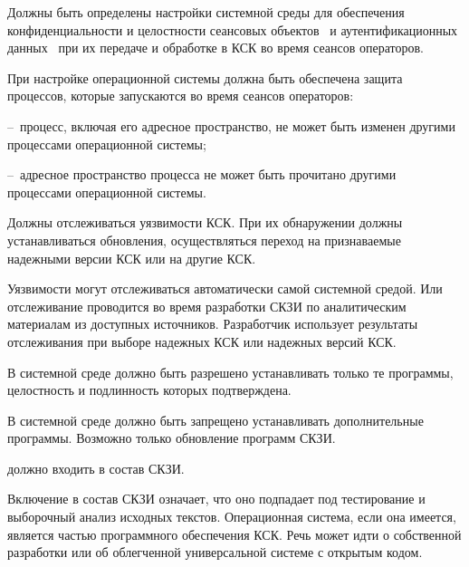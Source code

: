 \label{R.ES.Session}
Должны быть определены настройки системной среды
для обеспечения конфиденциальности и целостности сеансовых 
объектов~ и аутентификационных 
данных~ при их передаче и  
обработке в КСК во время сеансов операторов.

\begin{note}
При настройке операционной системы должна быть обеспечена защита 
процессов, которые запускаются во время сеансов операторов:

--~процесс, включая его адресное пространство, не может быть 
изменен другими процессами операционной системы;

--~адресное пространство процесса не может быть прочитано другими процессами 
операционной системы.
\end{note}

\label{R.ES.CVE}
Должны отслеживаться уязвимости КСК. При их обнаружении должны 
устанавливаться обновления, осуществляться переход на признаваемые надежными
версии КСК или на другие КСК.

\begin{note}
Уязвимости могут отслеживаться автоматически самой системной средой.
Или отслеживание проводится во время разработки СКЗИ по аналитическим
материалам из доступных источников. Разработчик использует результаты
отслеживания при выборе надежных КСК или надежных версий КСК.
\end{note}

\label{R.ES.AuthCode}
В системной среде должно быть разрешено устанавливать только те программы,
целостность и подлинность которых подтверждена.


\label{R.ES.NoCode}
В системной среде должно быть запрещено устанавливать дополнительные программы.
Возможно только обновление программ СКЗИ.

\label{R.ES.OS}
 должно входить в состав СКЗИ.


\begin{note}
Включение  в состав СКЗИ означает, что оно 
подпадает под тестирование и выборочный анализ исходных текстов. 
%
Операционная система, если она имеется, является частью программного 
обеспечения КСК. 
%
Речь может идти 
о  
собственной разработки или 
об облегченной универсальной  системе с 
открытым кодом.
%
\end{note}

